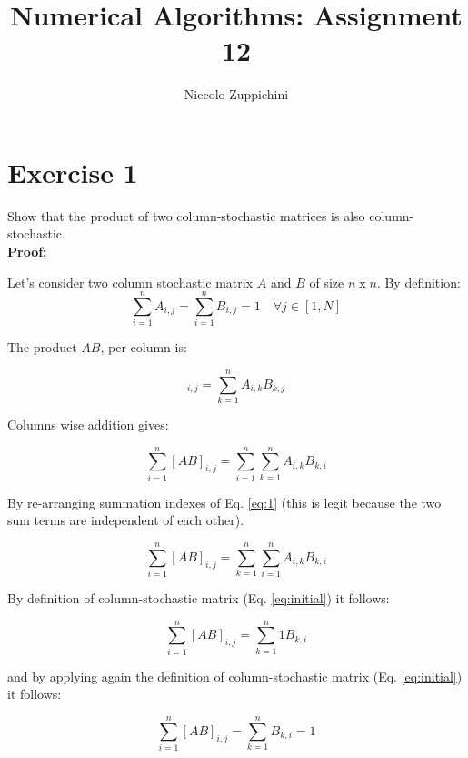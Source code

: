 \documentclass[12pt]{article}
\title{Numerical Algorithms: Assignment 12}
\author{Niccolo Zuppichini}
\begin{document}
\maketitle

\section*{Exercise 1}

Show that the product of two column-stochastic matrices is also column-stochastic. \\

\textbf{Proof:}

Let's consider two column stochastic matrix $A$ and $B$ of size $n \; \textrm{x} \; n$. By definition: \\

\begin{equation}
	\sum_{i=1}^n A_{i, j} = \sum_{i=1}^n B_{i, j} = 1 \quad \forall j \in [1, N]
	\label{eq:initial}
\end{equation}

The product $AB$, per column is:
 

\begin{equation}
	[AB]_{i, j} = \sum_{k=1}^n A_{i, k} B_{k, j}
	\label{eq:ab_product}
\end{equation}

Columns wise addition gives: 

\begin{equation}
\sum_{i=1}^n [AB]_{i, j} = \sum_{i=1}^n \sum_{k=1}^n A_{i, k} B_{k, i} 	
\label{eq:1}
\end{equation}

By re-arranging summation indexes of Eq. \ref{eq:1} (this is legit because the two sum terms are independent of each other).

\begin{equation}
\sum_{i=1}^n [AB]_{i, j} = \sum_{k=1}^n \sum_{i=1}^n A_{i, k} B_{k, i} 	
\label{eq:2}
\end{equation}

By definition of column-stochastic matrix (Eq. \ref{eq:initial}) it follows: 

\begin{equation}
\sum_{i=1}^n [AB]_{i, j} = \sum_{k=1}^n 1 B_{k, i} 	
\label{eq:3}
\end{equation}

and by applying again the definition of column-stochastic matrix (Eq. \ref{eq:initial}) it follows: 

\begin{equation}
\sum_{i=1}^n [AB]_{i, j} = \sum_{k=1}^n B_{k, i} 	= 1
\label{eq:3}
\end{equation}
\end{document}
